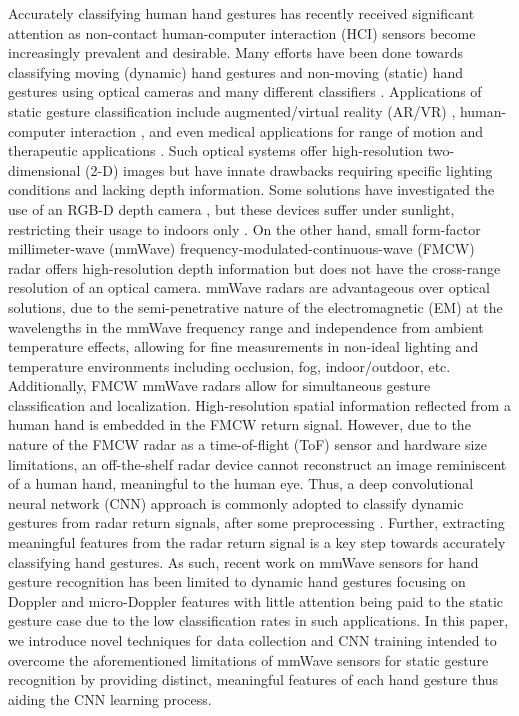 \documentclass{ieeeaccess}
\begin{document}
Accurately classifying human hand gestures has recently received significant attention as non-contact human-computer interaction (HCI) sensors become increasingly prevalent and desirable. Many efforts have been done towards classifying moving (dynamic) hand gestures and non-moving (static) hand gestures using optical cameras and many different classifiers \cite{hand_pose_classification:comparison_of_classifiers}. Applications of static gesture classification include augmented/virtual reality (AR/VR) \cite{hand_pose_classification:depth_sensor_bad_sunlight}, human-computer interaction \cite{hand_pose_classification:OUHANDS_database}, and even medical applications for range of motion and therapeutic applications \cite{hand_pose_classification:medical}. Such optical systems offer high-resolution two-dimensional (2-D) images but have innate drawbacks requiring specific lighting conditions and lacking depth information. Some solutions have investigated the use of an RGB-D depth camera \cite{hand_pose_classification:depth_RGBD_camera}, but these devices suffer under sunlight, restricting their usage to indoors only \cite{hand_pose_classification:depth_sensor_bad_sunlight}. On the other hand, small form-factor millimeter-wave (mmWave) frequency-modulated-continuous-wave (FMCW) radar offers high-resolution depth information but does not have the cross-range resolution of an optical camera. mmWave radars are advantageous over optical solutions, due to the semi-penetrative nature of the electromagnetic (EM) at the wavelengths in the mmWave frequency range and independence from ambient temperature effects, allowing for fine measurements in non-ideal lighting and temperature environments including occlusion, fog, indoor/outdoor, etc. Additionally, FMCW mmWave radars allow for simultaneous gesture classification and localization. High-resolution spatial information reflected from a human hand is embedded in the FMCW return signal. However, due to the nature of the FMCW radar as a time-of-flight (ToF) sensor and hardware size limitations, an off-the-shelf radar device cannot reconstruct an image reminiscent of a human hand, meaningful to the human eye. Thus, a deep convolutional neural network (CNN) approach is commonly adopted to classify dynamic gestures from radar return signals, after some preprocessing \cite{dynamic_gesture_recognition:application_of_Dopper_DCNN}. Further, extracting meaningful features from the radar return signal is a key step towards accurately classifying hand gestures. As such, recent work on mmWave sensors for hand gesture recognition has been limited to dynamic hand gestures focusing on Doppler and micro-Doppler features \cite{dynamic_gesture_recognition:low_power,dynamic_gesture_recognition:LSTM,dynamic_gesture_recognition:micro_doppler,dynamic_gesture_recognition:svm} with little attention being paid to the static gesture case \cite{static_gesture_recognition:time_domain} due to the low classification rates in such applications. In this paper, we introduce novel techniques for data collection and CNN training intended to overcome the aforementioned limitations of mmWave sensors for static gesture recognition by providing distinct, meaningful features of each hand gesture thus aiding the CNN learning process.
\end{document}
